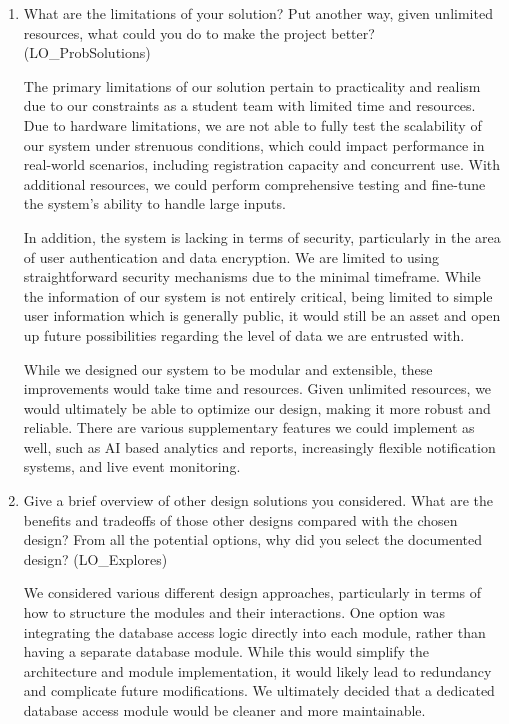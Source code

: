 \documentclass[12pt, titlepage]{article}
\begin{document}
\begin{enumerate}
  \item What are the limitations of your solution?  Put another way, given
  unlimited resources, what could you do to make the project better? (LO\_ProbSolutions)

  The primary limitations of our solution pertain to practicality and realism due to our constraints as a student team with limited time and resources. Due to hardware limitations, we are not able to fully test the scalability of our system under strenuous conditions, which could impact performance in real-world scenarios, including registration capacity and concurrent use. With additional resources, we could perform comprehensive testing and fine-tune the system's ability to handle large inputs.

  In addition, the system is lacking in terms of security, particularly in the area of user authentication and data encryption. We are limited to using straightforward security mechanisms due to the minimal timeframe. While the information of our system is not entirely critical, being limited to simple user information which is generally public, it would still be an asset and open up future possibilities regarding the level of data we are entrusted with.

  While we designed our system to be modular and extensible, these improvements would take time and resources. Given unlimited resources, we would ultimately be able to optimize our design, making it more robust and reliable. There are various supplementary features we could implement as well, such as AI based analytics and reports, increasingly flexible notification systems, and live event monitoring.

  \item Give a brief overview of other design solutions you considered.  What
  are the benefits and tradeoffs of those other designs compared with the chosen
  design?  From all the potential options, why did you select the documented design?
  (LO\_Explores)

  We considered various different design approaches, particularly in terms of how to structure the modules and their interactions. One option was integrating the database access logic directly into each module, rather than having a separate database module. While this would simplify the architecture and module implementation, it would likely lead to redundancy and complicate future modifications. We ultimately decided that a dedicated database access module would be cleaner and more maintainable.


\end{enumerate}
\end{document}
